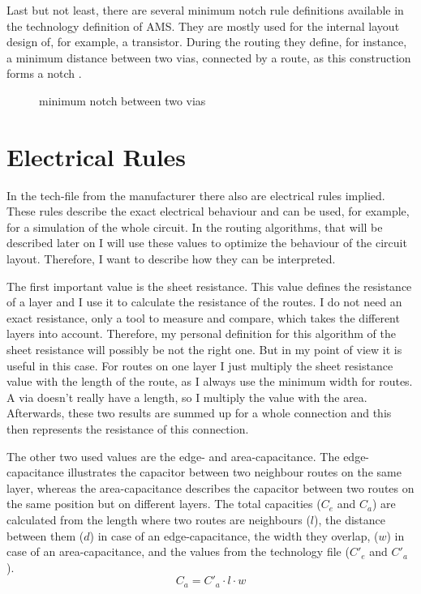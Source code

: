 Last but not least, there are several minimum notch rule definitions available in the technology definition of AMS. They are mostly used for the internal layout design of, for example, a transistor. During the routing they define, for instance, a minimum distance between two vias, connected by a route, as this construction forms a notch .

\begin{figure}
	\centering
	
	\caption{minimum notch between two vias}
	\label{fig:technology_rule_notch}
\end{figure}

\section{Electrical Rules}
\label{sec:electrical_rules}
In the tech-file from the manufacturer there also are electrical rules implied. These rules describe the exact electrical behaviour and can be used, for example, for a simulation of the whole circuit. In the routing algorithms, that will be described later on  I will use these values to optimize the behaviour of the circuit layout. Therefore, I want to describe how they can be interpreted.

The first important value is the sheet resistance. This value defines the resistance of a layer and I use it to calculate the resistance of the routes. I do not need an exact resistance, only a tool to measure and compare, which takes the different layers into account. Therefore, my personal definition for this algorithm of the sheet resistance will possibly be not the right one. But in my point of view it is useful in this case. For routes on one layer I just multiply the sheet resistance value with the length of the route, as I always use the minimum width for routes. A via doesn't really have a length, so I multiply the value with the area. Afterwards, these two results are summed up for a whole connection and this then represents the resistance of this connection.

The other two used values are the edge- and area-capacitance. The edge-capacitance illustrates the capacitor between two neighbour routes on the same layer, whereas the area-capacitance describes the capacitor between two routes on the same position but on different layers. The total capacities ($C_e$ and $C_a$) are calculated from the length where two routes are neighbours ($l$), the distance between them ($d$) in case of an edge-capacitance, the width they overlap, ($w$) in case of an area-capacitance, and the values from the technology file ($C'_e$ and $C'_a$).
\begin{equation}
	\label{eq:area_capacitance}
	C_a = C'_a \cdot l \cdot w
\end{equation}

